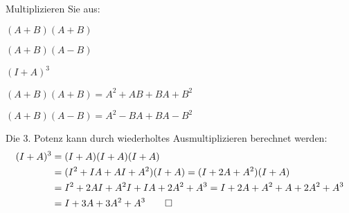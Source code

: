 Multiplizieren Sie aus:
\begin{teilaufgaben}
\item $(A+B)(A+B)$
\item $(A+B)(A-B)$
\item $(I+A)^3$
\end{teilaufgaben}

\begin{loesung}
\begin{teilaufgaben}
\item $(A+B)(A+B) = A^2 + AB + BA + B^2$
\item $(A+B)(A-B) = A^2-BA+BA-B^2$
\item Die 3. Potenz kann durch wiederholtes Ausmultiplizieren berechnet werden:
\begin{align*}
(I+A)^3 
&=
(I+A)(I+A)(I+A)
\\
&=
(I^2+IA+AI+A^2)(I+A)
=
(I+2A+A^2)(I+A)
\\
&=
I^2+2AI+A^2I+IA+2A^2+A^3
=
I+2A+A^2+A+2A^2+A^3
\\
&=
I+3A+3A^2+A^3
\qedhere
\end{align*}
\end{teilaufgaben}
\end{loesung}

